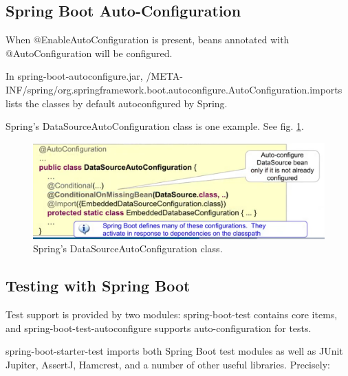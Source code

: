 \documentclass{scrartcl}
\begin{document}
\subsection{Spring Boot Auto-Configuration}

When @EnableAutoConfiguration is present, beans annotated with @AutoConfiguration  will be configured.

In spring-boot-autoconfigure.jar, /META-INF/spring/org.springframework.boot.autoconfigure.AutoConfiguration.imports lists the classes by default autoconfigured by Spring.

Spring's DataSourceAutoConfiguration class is one example. See fig. \ref{fig:datasourceautoconfiguration}.

\begin{figure}
    \centering
    \includegraphics[width=1\linewidth]{datasourceautoconfiguration}
    \caption{Spring's DataSourceAutoConfiguration class.}
    \label{fig:datasourceautoconfiguration}
\end{figure}

\subsection{Testing with Spring Boot}

Test support is provided by two modules: spring-boot-test contains core items, and spring-boot-test-autoconfigure supports auto-configuration for tests.

spring-boot-starter-test imports both Spring Boot test modules as well as JUnit Jupiter, AssertJ, Hamcrest, and a number of other useful libraries. Precisely:
\end{document}
